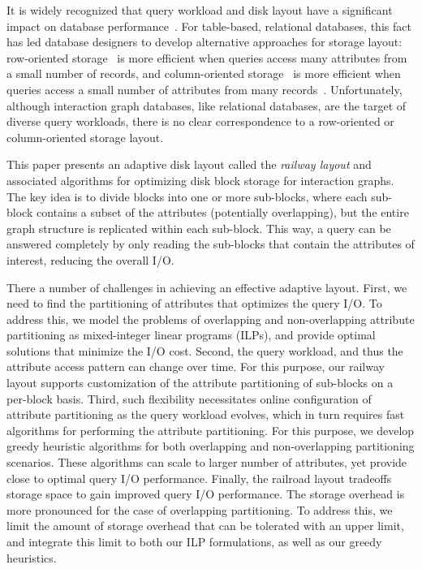 It is widely recognized that query workload and disk layout have a significant
impact on database performance~\cite{alagiannis14,grund10,stonebraker05}.  For
table-based, relational databases, this fact has led database designers to
develop alternative approaches for storage layout: row-oriented
storage~\cite{rowOrg} is more efficient when queries access many attributes
from a small number of records, and column-oriented storage~\cite{colOrg} is
more efficient when queries access a small number of attributes from many
records~\cite{stonebraker05}.  Unfortunately, although interaction graph
databases, like relational databases, are the target of diverse query
workloads, there is no clear correspondence to a row-oriented or
column-oriented storage layout.

This paper presents an adaptive disk layout called the \emph{railway layout}
and associated algorithms for optimizing disk block storage for interaction
graphs. The key idea is to divide blocks into one or more sub-blocks, where
each sub-block contains a subset of the attributes (potentially overlapping),
but the entire graph structure is replicated within each sub-block. This way,
a query can be answered completely by only reading the sub-blocks that contain
the attributes of interest, reducing the overall I/O. 

There a number of challenges in achieving an effective adaptive layout. First,
we need to find the partitioning of attributes that optimizes the query I/O.
To address this, we model the problems of overlapping and non-overlapping
attribute partitioning as mixed-integer linear programs (ILPs), and provide
optimal solutions that minimize the I/O cost. Second, the query workload, and
thus the attribute access pattern can change over time. For this purpose, our
railway layout supports customization of the attribute partitioning of
sub-blocks on a per-block basis. Third, such flexibility necessitates online
configuration of attribute partitioning as the query workload evolves, which
in turn requires fast algorithms for performing the attribute partitioning.
For this purpose, we develop greedy heuristic algorithms for both overlapping
and non-overlapping partitioning scenarios. These algorithms can scale to
larger number of attributes, yet provide close to optimal query I/O
performance. Finally, the railroad layout tradeoffs storage space to gain
improved query I/O performance. The storage overhead is more pronounced for
the case of overlapping partitioning. To address this, we limit the amount of
storage  overhead that can be tolerated with an upper limit, and integrate
this limit to both our ILP formulations, as well as our greedy heuristics.

